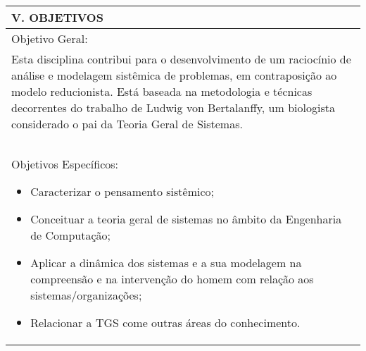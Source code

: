 \documentclass[12pt]{article}
\begin{document}
\begin{longtable}{|L{1.025\textwidth}|} \hline
%
{\bf V. OBJETIVOS } \\ \hline
%
Objetivo Geral:\\
Esta disciplina contribui para o desenvolvimento de um raciocínio de análise e modelagem sistêmica de problemas, em contraposição ao modelo reducionista. Está baseada na metodologia e técnicas decorrentes do trabalho de Ludwig von Bertalanffy, um biologista considerado o pai da Teoria Geral de Sistemas.\\
\\
\\
Objetivos Específicos:
\begin{itemize}
\item Caracterizar o pensamento sistêmico;
\item  Conceituar a teoria geral de sistemas no âmbito da Engenharia de Computação;
\item  Aplicar a dinâmica dos sistemas e a sua modelagem na compreensão e na intervenção do homem com relação aos sistemas/organizações;
\item  Relacionar a TGS come outras áreas do conhecimento.
\end{itemize}
\\ \hline
\end{longtable}
\end{document}
